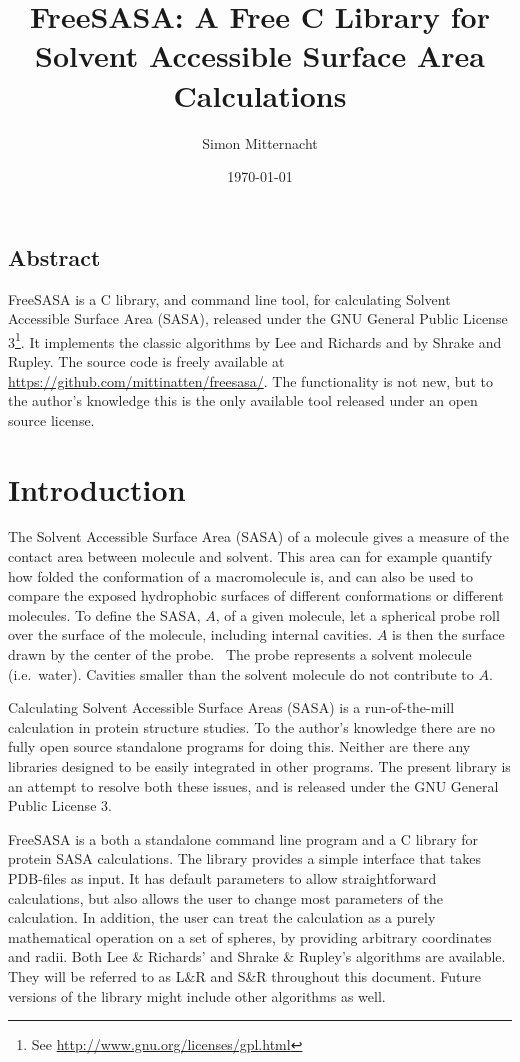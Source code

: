 \documentclass[a4paper,11pt]{article}
\author{Simon Mitternacht}
\date{\today}
\title{FreeSASA: A Free C Library for Solvent Accessible Surface
  Area Calculations}
\begin{document}
\maketitle

\subsection*{Abstract}
FreeSASA is a C library, and command line tool, for calculating
Solvent Accessible Surface Area (SASA), released under the GNU General
Public License 3\footnote{See
  \url{http://www.gnu.org/licenses/gpl.html}}. It implements the
classic algorithms by Lee and Richards and by Shrake and Rupley. The
source code is freely available at
\url{https://github.com/mittinatten/freesasa/}.  The functionality is
not new, but to the author's knowledge this is the only available tool
released under an open source license.

\section{Introduction}
The Solvent Accessible Surface Area (SASA) of a molecule gives a
measure of the contact area between molecule and solvent. This
area can for example quantify how folded the conformation of a
macromolecule is, and can also be used to compare the exposed
hydrophobic surfaces of different conformations or different
molecules. To define the SASA, $A$, of a given molecule, let a
spherical probe roll over the surface of the molecule, including
internal cavities. $A$ is then the surface drawn by the center of the
probe.~\cite{LnR} The probe represents a solvent molecule
(i.e.\ water). Cavities smaller than the solvent molecule do not
contribute to $A$.

Calculating Solvent Accessible Surface Areas (SASA) is a
run-of-the-mill calculation in protein structure studies. To the
author's knowledge there are no fully open source standalone programs
for doing this. Neither are there any libraries designed to be easily
integrated in other programs. The present library is an attempt to
resolve both these issues, and is released under the GNU General
Public License 3.

FreeSASA is a both a standalone command line program and a C library
for protein SASA calculations. The library provides a simple interface
that takes PDB-files as input. It has default parameters to allow
straightforward calculations, but also allows the user to change most
parameters of the calculation. In addition, the user can treat the
calculation as a purely mathematical operation on a set of spheres, by
providing arbitrary coordinates and radii. Both Lee \& Richards'
\cite{LnR} and Shrake \& Rupley's \cite{SnR} algorithms are
available. They will be referred to as L\&R and S\&R throughout this
document. Future versions of the library might include other
algorithms as well.
\end{document}
